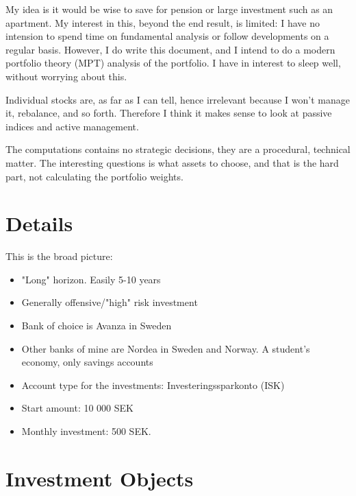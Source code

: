 \documentclass[a4paper]{article}
\title{\documenttitle}
\date{\today}
\author{Frans Englich \\
        \href{mailto:fenglich@fastmail.fm}{fenglich@fastmail.fm}}
\begin{document}
\maketitle

My idea is it would be wise to save for pension or large investment such as an apartment. My interest in this, beyond the end result, is limited: I have no intension to spend time on fundamental analysis or follow developments on a regular basis. However, I do write this document, and I intend to do a modern portfolio theory (MPT) analysis of the portfolio. I have in interest to sleep well, without worrying about this.

Individual stocks are, as far as I can tell, hence irrelevant because I won't manage it, rebalance, and so forth. Therefore I think it makes sense to look at passive indices and active management.

The computations contains no strategic decisions, they are a procedural, technical matter. The interesting questions is what assets to choose, and that is the hard part, not calculating the portfolio weights.

\section{Details}

This is the broad picture:

\begin{itemize}
\item "Long" horizon. Easily 5-10 years
\item Generally offensive/"high" risk investment
\item Bank of choice is Avanza in Sweden
\item Other banks of mine are Nordea in Sweden and Norway. A student's economy, only savings accounts
\item Account type for the investments: Investeringssparkonto (ISK)
\item Start amount: 10 000 SEK
\item Monthly investment: 500 SEK.
\end{itemize}

\section{Investment Objects}
\end{document}
